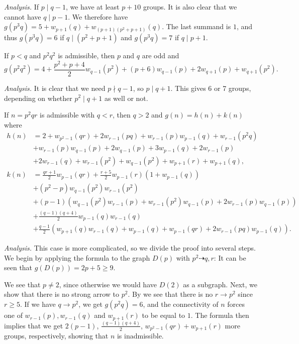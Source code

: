 \textit{Analysis.} If $p \mid q - 1$, we have at least $p + 10$ groups.
It is also clear that we cannot have $q \mid p - 1$.
We therefore have $g(p^3 q) = 5 + w_{p + 1}(q) + w_{(p + 1)(p^2 + p + 1)}(q)$.
The last summand is $1$, and thus $g(p^3 q) = 6$ if $q \mid (p^2 + p + 1)$ and $g(p^3 q) = 7$ if $q \mid p + 1$.

\begin{eufact}
	If $p < q$ and $p^2 q^2$ is admissible, then $p$ and $q$ are odd and
	\[g(p^2 q^2) = 4 + \frac{p^2 + p + 4}{2} w_{q - 1}(p^2) + (p + 6)w_{q - 1}(p) + 2w_{q + 1}(p) + w_{q + 1}(p^2).\]
\end{eufact}

\textit{Analysis.} It is clear that we need $p \nmid q - 1$, so $p \mid q + 1$.
This gives 6 or 7 groups, depending on whether $p^2 \mid q + 1$ as well or not.

\begin{eufact} 
	If $n = p^2 q r$ is admissible with $q < r$, then $q > 2$ and $g(n) = h(n) + k(n)$ where$$\begin{aligned}
		h(n) &= 2 + w_{p^2 - 1}(qr) + 2w_{r - 1}(pq) + w_{r - 1}(p)w_{p - 1}(q) + w_{r - 1}(p^2 q) \\ 
		&+ w_{r - 1}(p)w_{q - 1}(p) + 2w_{q - 1}(p) + 3w_{p - 1}(q) + 2w_{r - 1}(p) \\ 
		&+ 2w_{r - 1}(q) + w_{r - 1}(p^2) + w_{q - 1}(p^2) + w_{p + 1}(r) + w_{p + 1}(q), \\
		k(n) &= \frac{qr + 1}{2} w_{p - 1}(qr) + \frac{r + 5}{2} w_{p - 1}(r)(1 + w_{p - 1}(q))\\
		&+ (p^2 - p)w_{q - 1}(p^2)w_{r - 1}(p^2) \\
		&+ (p - 1)(w_{q - 1}(p^2)w_{r - 1}(p) + w_{r - 1}(p^2)w_{q - 1}(p) + 2w_{r - 1}(p)w_{q - 1}(p)) \\
		&+ \frac{(q - 1)(q + 4)}{2} w_{p - 1}(q)w_{r - 1}(q) \\
		&+ \frac{q - 1}{2} (w_{p + 1}(q)w_{r - 1}(q) + w_{p - 1}(q) + w_{p - 1}(qr) + 2w_{r - 1}(pq)w_{p - 1}(q)).
	\end{aligned}$$
\end{eufact}

\textit{Analysis.} This case is more complicated, so we divide the proof into several steps.
We begin by applying the formula to the graph $D(p)$ with $p^2 \dashrightarrow q, r$: It can be seen that $g(D(p)) = 2p + 5 \ge 9$.

We see that $p \neq 2$, since otherwise we would have $D(2)$ as a subgraph.
Next, we show that there is no strong arrow to $p^2$.
By  we see that there is no $r \to p^2$ since $r \ge 5$.
If we have $q \to p^2$, we get $g(p^2 q) = 6$, and the connectivity of $n$ forces one of $w_{r - 1}(p), w_{r - 1}(q)$ and $w_{p + 1}(r)$ to be equal to $1$.
The formula then implies that we get
$2(p - 1)$, $\frac{(q - 1)(q + 4)}{2}$,  $w_{p^2 - 1}(qr) + w_{p + 1}(r)$
more groups, respectively, showing that $n$ is inadmissible.


